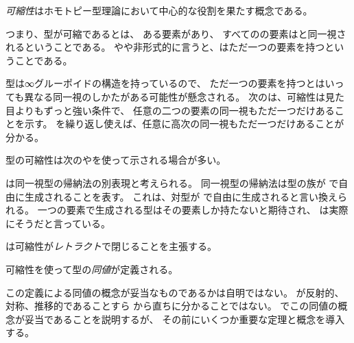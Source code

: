 \documentclass[index]{subfiles}
\begin{document}

\emph{可縮性}はホモトピー型理論において中心的な役割を果たす概念である。



つまり、型が可縮であるとは、
ある要素があり、
すべてのの要素は\myInlineMath{\myCenter}と同一視されるということである。
やや非形式的に言うと、はただ一つの要素を持つということである。



型は∞グルーポイドの構造を持っているので、
ただ一つの要素を持つとはいっても異なる同一視のしかたがある可能性が懸念される。
次のは、可縮性は見た目よりもずっと強い条件で、
任意の二つの要素の同一視もただ一つだけあることを示す。
を繰り返し使えば、任意に高次の同一視もただ一つだけあることが分かる。



型の可縮性は次のやを使って示される場合が多い。



は同一視型の帰納法の別表現と考えられる。
同一視型の帰納法は型の族が
で自由に生成されることを表す。
これは、対型が
で自由に生成されると言い換えられる。
一つの要素で生成される型はその要素しか持たないと期待され、
は実際にそうだと言っている。

は可縮性が\emph{レトラクト}で閉じることを主張する。




可縮性を使って型の\emph{同値}が定義される。





この定義による同値の概念が妥当なものであるかは自明ではない。
\myInlineMath{\myEquiv}が反射的、対称、推移的であることすら
から直ちに分かることではない。
でこの同値の概念が妥当であることを説明するが、
その前にいくつか重要な定理と概念を導入する。
\end{document}
